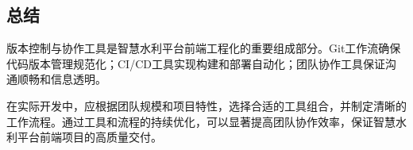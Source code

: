 \subsection{总结}\label{ux603bux7ed3}

版本控制与协作工具是智慧水利平台前端工程化的重要组成部分。Git工作流确保代码版本管理规范化；CI/CD工具实现构建和部署自动化；团队协作工具保证沟通顺畅和信息透明。

在实际开发中，应根据团队规模和项目特性，选择合适的工具组合，并制定清晰的工作流程。通过工具和流程的持续优化，可以显著提高团队协作效率，保证智慧水利平台前端项目的高质量交付。
